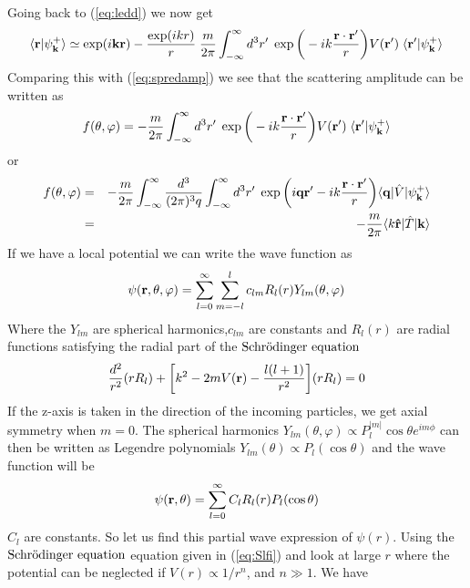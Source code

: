 %
Going back to (\ref{eq:ledd}) we now get
%
\begin{equation}
\langle{\bf r}|\psi_{\bf k}^{+}\rangle \simeq\exp (i{\bf kr}) - \frac{\exp (i{ kr})}{r}\;\frac{m}{2\pi}
\int^{\infty}_{-\infty}d^3 {{ r}'}\;\exp \bigg(-ik\frac{{\bf r\cdot r}'}{r}\bigg)
{V}({{\bf r}'})\;\langle{\bf r}'|\psi_{\bf k}^{+}\rangle
\end{equation} 
%
Comparing this with (\ref{eq:spredamp}) we see that the scattering amplitude can be written as
%
\begin{equation}\label{eq:fogT}
f(\theta ,\varphi)=-\frac{m}{2\pi}
\int^{\infty}_{-\infty}d^3 {{ r}'}\;\exp \bigg(-ik\frac{{\bf r\cdot r}'}{r}\bigg)
{V}({{\bf r}'})\;\braket{{\bf r}'}{\psi_{\bf k}^{+}}
\end{equation}
%
or
%
\begin{eqnarray}\label{eq:fogT2} 
f(\theta ,\varphi)
&=&
-\frac{m}{2\pi}
\int^{\infty}_{-\infty}\frac{d^3}{(2\pi)^3{ q}}\int^{\infty}_{-\infty}d^3 {{ r}'}\;
\exp \bigg(i{\bf qr}'-ik\frac{{\bf r\cdot r}'}{r}\bigg)
\braketm{{\bf q}}{\op{V}}{\psi_{\bf k}^{+}}\nonumber\\
&=&
-\frac{m}{2\pi}\braketm{k{\bf \op{r}}}{\op{T}}{{\bf k}}
\end{eqnarray}
%
%
%
%
If we have a local potential we can write the wave function as
%
\begin{equation}
\psi ({\bf r},\theta ,\varphi)=\sum^\infty_{l=0}\sum^l_{m=-l}c_{lm}R_l(r)Y_{lm}(\theta ,\varphi) 
\end{equation}
%
Where the $Y_{lm}$ are spherical harmonics,$c_{lm}$ are constants and 
$R_l(r)$ are radial functions satisfying the radial part of the $\text{Schr$\ddot{\textrm{o}}$dinger equation}$ 
%
\begin{equation}
\frac{d^2}{r^2}(rR_l)+\bigg[ k^2-2mV({\bf r})-\frac{l(l+1)}{r^2}\bigg](rR_l)=0
\end{equation}
%
If the z-axis is taken in the direction of the incoming particles, we get axial symmetry when $m=0$. The
spherical harmonics $Y_{lm}(\theta ,\varphi)\propto P_l^{|m|}\cos\theta e^{im\phi}$ can then be written as
Legendre polynomials
$Y_{lm}(\theta)\propto P_l(\cos\theta)$ and the wave function will be
%
\begin{equation}
\psi ({\bf r},\theta)=\sum^\infty_{l=0}C_l R_l(r)P_{l}(\cos\theta )
\end{equation}
%
$C_l$ are constants. So let us find this partial wave expression of $\psi (r)$. Using the $\text{Schr$\ddot{\textrm{o}}$dinger equation}$ equation
given in (\ref{eq:Slfi}) and look at large  $r$ where the potential can be neglected if
$V(r)\propto 1/r^n$, and $n\gg 1$. We have  
